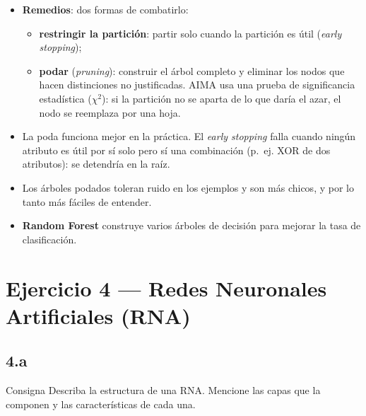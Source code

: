\documentclass[11pt,a4paper]{article}
\begin{document}
\begin{extras}
\begin{itemize}
  \item \textbf{Remedios}: dos formas de combatirlo:
  \begin{itemize}
    \item \textbf{restringir la partición}: partir solo cuando la partición es útil (\textit{early stopping});
    \item \textbf{podar} (\textit{pruning}): construir el árbol completo y eliminar los nodos que hacen distinciones no justificadas. AIMA usa una prueba de significancia estadística ($\chi^2$): si la partición no se aparta de lo que daría el azar, el nodo se reemplaza por una hoja.
  \end{itemize}
  \item La poda funciona mejor en la práctica. El \textit{early stopping} falla cuando ningún atributo es útil por sí solo pero sí una combinación (p.~ej. XOR de dos atributos): se detendría en la raíz.
  \item Los árboles podados toleran ruido en los ejemplos y son más chicos, y por lo tanto más fáciles de entender.
  \item \textbf{Random Forest} construye varios árboles de decisión para mejorar la tasa de clasificación.
\end{itemize}
\end{extras}

\section{Ejercicio 4 --- Redes Neuronales Artificiales (RNA)}

\subsection{4.a}

\begin{enunciado}{Consigna}
Describa la estructura de una RNA. Mencione las capas que la componen y las características de cada una.
\end{enunciado}
\end{document}
